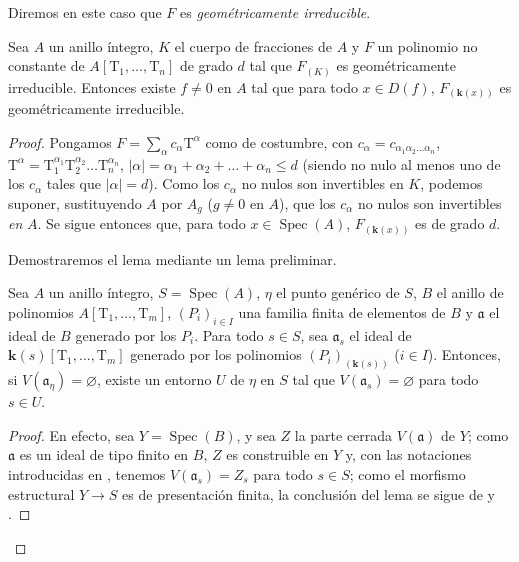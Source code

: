 Diremos en este caso que $F$ es \emph{geométricamente irreducible}.

\begin{lemma}[9.7.5]
\label{IV.9.7.5}
Sea $A$ un anillo íntegro, $K$ el cuerpo de fracciones de $A$ y $F$ un polinomio no constante de $A[\mathrm{T}_1,\ldots,\mathrm{T}_n]$ de grado $d$ tal que $F_{(K)}$ es geométricamente irreducible.
Entonces existe $f\neq 0$ en $A$ tal que para todo $x\in D(f)$, $F_{(\mathbf{k}(x))}$ es geométricamente irreducible.
\end{lemma}

\begin{proof}
Pongamos $F=\sum_\alpha c_\alpha \mathrm{T}^\alpha$ como de costumbre, con $c_\alpha=c_{\alpha_1\alpha_2\ldots\alpha_n}$, $\mathrm{T}^\alpha=\mathrm{T}_1^{\alpha_1}\mathrm{T}_2^{\alpha_2}\ldots\mathrm{T}_n^{\alpha_n}$, $|\alpha|=\alpha_1+\alpha_2+\ldots+\alpha_n\leqslant d$ (siendo no nulo al menos uno de los $c_\alpha$ tales que $|\alpha|=d$).
Como los $c_\alpha$ no nulos son invertibles en $K$, podemos suponer, sustituyendo $A$ por $A_g$ ($g\neq 0$ en $A$), que los $c_\alpha$ no nulos son invertibles \emph{en} $A$.
Se sigue entonces que, para todo $x\in\operatorname{Spec}(A)$, $F_{(\mathbf{k}(x))}$ es de grado $d$.

Demostraremos el lema mediante un lema preliminar.

\begin{lemma}[9.7.5.1]
\label{IV.9.7.5.1}
Sea $A$ un anillo íntegro, $S=\operatorname{Spec}(A)$, $\eta$ el punto genérico de $S$, $B$ el anillo de polinomios $A[\mathrm{T}_1,\ldots,\mathrm{T}_m]$, $(P_i)_{i\in I}$ una familia finita de elementos de $B$ y $\mathfrak{a}$ el ideal de $B$ generado por los $P_i$.
Para todo $s\in S$, sea $\mathfrak{a}_s$ el ideal de $\boldsymbol{k}(s)[\mathrm{T}_1,\ldots,\mathrm{T}_m]$ generado por los polinomios $(P_i)_{(\mathbf{k}(s))}$ ($i\in I$).
Entonces, si $V(\mathfrak{a}_\eta)=\varnothing$, existe un entorno $U$ de $\eta$ en $S$ tal que $V(\mathfrak{a}_s)=\varnothing$ para todo $s\in U$.
\end{lemma}

\begin{proof}
En efecto, sea $Y=\operatorname{Spec}(B)$, y sea $Z$ la parte cerrada $V(\mathfrak{a})$ de $Y$; como $\mathfrak{a}$ es un ideal de tipo finito en $B$, $Z$ es construible en $Y$  y, con las notaciones introducidas en , tenemos $V(\mathfrak{a}_s)=Z_s$ para todo $s\in S$; como el morfismo estructural $Y\to S$ es de presentación finita, la conclusión del lema se sigue de  y .
\end{proof}


\end{proof}
